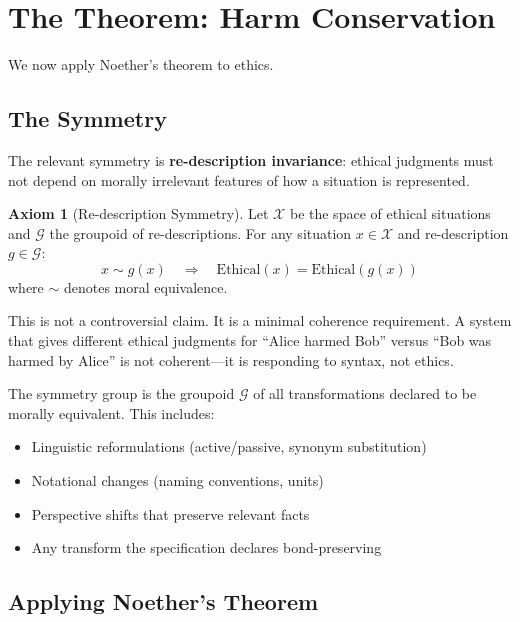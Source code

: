 \documentclass[12pt,letterpaper]{article}
\theoremstyle{definition}
\newtheorem{axiom}{Axiom}
\theoremstyle{remark}
\newcommand{\G}{\mathcal{G}}
\begin{document}
\section{The Theorem: Harm Conservation}

We now apply Noether's theorem to ethics.

\subsection{The Symmetry}

The relevant symmetry is \textbf{re-description invariance}: ethical judgments must not depend on morally irrelevant features of how a situation is represented.

\begin{axiom}[Re-description Symmetry]
Let $\mathcal{X}$ be the space of ethical situations and $\G$ the groupoid of re-descriptions. For any situation $x \in \mathcal{X}$ and re-description $g \in \G$:
\begin{equation}
x \sim g(x) \quad \Rightarrow \quad \text{Ethical}(x) = \text{Ethical}(g(x))
\end{equation}
where $\sim$ denotes moral equivalence.
\end{axiom}

This is not a controversial claim. It is a minimal coherence requirement. A system that gives different ethical judgments for ``Alice harmed Bob'' versus ``Bob was harmed by Alice'' is not coherent---it is responding to syntax, not ethics.

The symmetry group is the groupoid $\G$ of all transformations declared to be morally equivalent. This includes:
\begin{itemize}
    \item Linguistic reformulations (active/passive, synonym substitution)
    \item Notational changes (naming conventions, units)
    \item Perspective shifts that preserve relevant facts
    \item Any transform the specification declares bond-preserving
\end{itemize}

\subsection{Applying Noether's Theorem}
\end{document}
